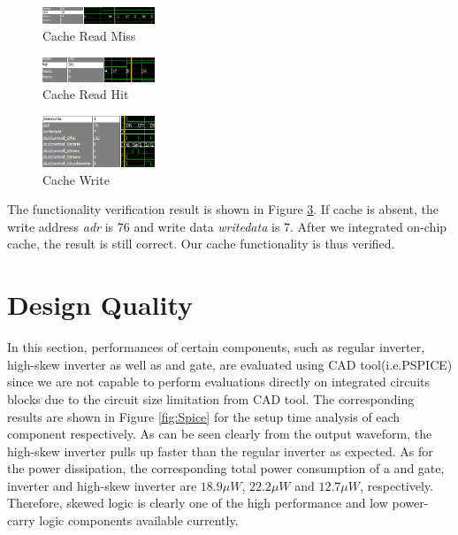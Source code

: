 \documentclass[conference]{IEEEtran}
\begin{document}
\begin{figure}[h!]
  \centering
    \includegraphics[width=0.3\textwidth]{cache_miss.png}
  \caption{Cache Read Miss}
  \label{fig:cache_miss}
\end{figure}

\begin{figure}[h!]
  \centering
    \includegraphics[width=0.3\textwidth]{cache_hit.png}
  \caption{Cache Read Hit}
  \label{fig:cache_hit}
\end{figure}

\begin{figure}[h!]
  \centering
    \includegraphics[width=0.3\textwidth]{cache_write.png}
  \caption{Cache Write}
  \label{fig:cache_write}
\end{figure}

The functionality verification result is shown in Figure \ref{fig:cache_write}. If cache is absent, the write address \textit{adr} is 76 and write data \textit{writedata} is 7. After we integrated on-chip cache, the result is still correct. Our cache functionality is thus verified.

\section{Design Quality}\label{quality}
 
 
 
In this section, performances of certain components, such as regular inverter, high-skew inverter as well as and gate, are evaluated using CAD tool(i.e.PSPICE) since we are not capable to perform evaluations directly on integrated circuits blocks due to the circuit size limitation from CAD tool. The corresponding results are shown in Figure \ref{fig:Spice} for the setup time analysis of each component respectively. As can be seen clearly from the output waveform, the high-skew inverter pulls up faster than the regular inverter as expected. As for the power dissipation, the corresponding total power consumption of a and gate, inverter and high-skew inverter are $18.9\mu W$, $22.2\mu W$ and $12.7\mu W$, respectively. Therefore, skewed logic is clearly one of the high performance and low power-carry logic components available currently.
\end{document}
